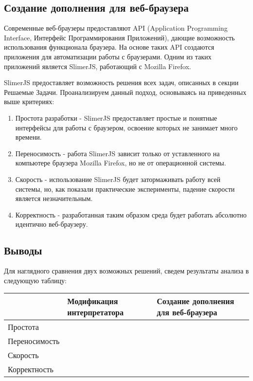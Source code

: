 \subsection{Создание дополнения для веб-браузера}
	Современные веб-браузеры предоставляют API (Application Programming Interface, Интерфейс Программирования Приложений), дающие возможность использования функционала браузера. На основе таких API создаются приложения для автоматизации работы с браузерами. Одним из таких приложений является SlimerJS, работающий с Mozilla Firefox. 


	SlimerJS предоставляет возможность решения всех задач, описанных в секции Решаемые Задачи. Проанализируем данный подход, основываясь на приведенных выше критериях:

	\begin{enumerate}
		\item Простота разработки - SlimerJS предоставляет простые и понятные интерфейсы для работы с браузером, освоение которых не занимает много времени.
		\item Переносимость - работа SlimerJS зависит только от уставленного на компьютере браузера Mozilla Firefox, но не от операционной системы.
		\item Скорость - использование SlimerJS будет затормаживать работу всей системы, но, как показали практические эксперименты, падение скорости является незначительным.
		\item Корректность - разработанная таким образом среда будет работать абсолютно идентично веб-браузеру.
	\end{enumerate}

\subsection{Выводы}
	Для наглядного сравнения двух возможных решений, сведем результаты анализа в следующую таблицу:

	\begin{table}[h]
		\centering
		\label{my-label}
	\begin{tabular}{|l|l|l|}
	\hline
	              & Модификация интерпретатора                      & Создание дополнения для веб-браузера \\ \hline
	Простота      & \cellcolor[HTML]{CB0000}                        & \cellcolor[HTML]{32CB00}             \\ \hline
	Переносимость & \cellcolor[HTML]{CB0000}                        & \cellcolor[HTML]{32CB00}             \\ \hline
	Скорость      & \cellcolor[HTML]{32CB00} 						& \cellcolor[HTML]{FFC702}             \\ \hline
	Корректность  & \cellcolor[HTML]{32CB00}                        & \cellcolor[HTML]{32CB00}             \\ \hline
	\end{tabular}
	\end{table}


